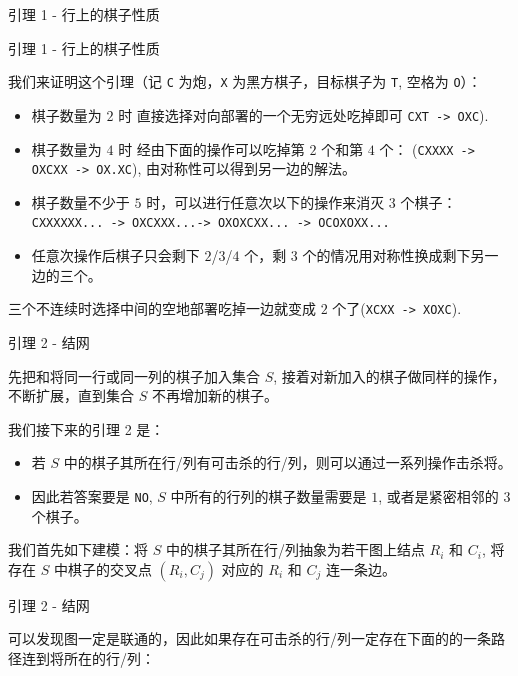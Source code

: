 \documentclass{beamer}
\begin{document}
{\begin{frame}{引理 1 - 行上的棋子性质}
\end{frame}

\begin{frame}{引理 1 - 行上的棋子性质}
  
我们来证明这个引理（记 \texttt{C} 为炮，\texttt{X} 为黑方棋子，目标棋子为 \texttt{T}, 空格为 \texttt{O}）：

\begin{itemize}
  \item 棋子数量为 $2$ 时 直接选择对向部署的一个无穷远处吃掉即可 \texttt{CXT -> OXC}).
  \item 棋子数量为 $4$ 时 经由下面的操作可以吃掉第 $2$ 个和第 $4$ 个： (\texttt{CXXXX -> OXCXX -> OX.XC}), 由对称性可以得到另一边的解法。
  \item 棋子数量不少于 $5$ 时，可以进行任意次以下的操作来消灭 $3$ 个棋子：\texttt{CXXXXXX... -> OXCXXX...-> OXOXCXX... -> OCOXOXX...}
  \item 任意次操作后棋子只会剩下 $2$/$3$/$4$ 个，剩 $3$ 个的情况用对称性换成剩下另一边的三个。
\end{itemize}

三个不连续时选择中间的空地部署吃掉一边就变成 $2$ 个了(\texttt{XCXX -> XOXC}).

\end{frame}

\begin{frame}{引理 2 - 结网}
  
先把和将同一行或同一列的棋子加入集合 $S$, 接着对新加入的棋子做同样的操作，不断扩展，直到集合 $S$ 不再增加新的棋子。

我们接下来的引理 2 是：

\begin{itemize}
  \item 若 $S$ 中的棋子其所在行/列有可击杀的行/列，则可以通过一系列操作击杀将。
  \item 因此若答案要是 \texttt{NO},  $S$ 中所有的行列的棋子数量需要是 $1$, 或者是紧密相邻的 $3$ 个棋子。
\end{itemize}

我们首先如下建模：将 $S$ 中的棋子其所在行/列抽象为若干图上结点 $R_i$ 和 $C_i$, 将存在 $S$ 中棋子的交叉点 $(R_i, C_j)$ 对应的 $R_i$ 和 $C_j$ 连一条边。




\end{frame}

\begin{frame}{引理 2 - 结网}
  
可以发现图一定是联通的，因此如果存在可击杀的行/列一定存在下面的的一条路径连到将所在的行/列：


\end{frame}}
\end{document}
